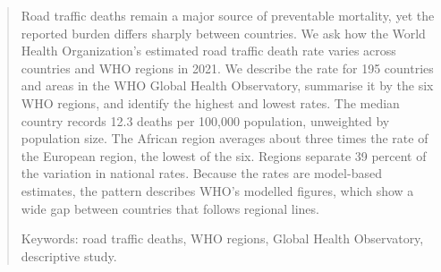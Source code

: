 \begin{abstract}
Road traffic deaths remain a major source of preventable mortality, yet the reported burden differs sharply between countries. We ask how the World Health Organization's estimated road traffic death rate varies across countries and WHO regions in 2021. We describe the rate for 195 countries and areas in the WHO Global Health Observatory, summarise it by the six WHO regions, and identify the highest and lowest rates. The median country records 12.3 deaths per 100,000 population, unweighted by population size.
The African region averages about three times the rate of the European region, the lowest of the six. Regions separate 39 percent of the variation in national rates.
Because the rates are model-based estimates, the pattern describes WHO's modelled figures, which show a wide gap between countries that follows regional lines.

\medskip
\noindent Keywords: road traffic deaths, WHO regions, Global Health Observatory, descriptive study.
\end{abstract}
